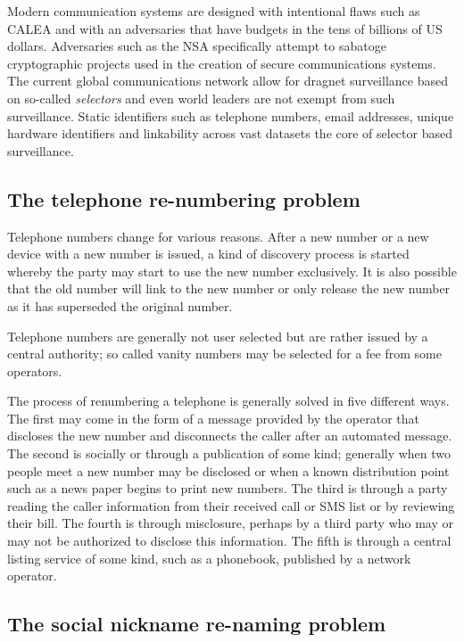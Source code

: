 \documentclass[letterpaper,twocolumn,10pt]{article}
\begin{document}
Modern communication systems are designed with intentional flaws such as
CALEA\cite{CALEA} and with an adversaries that have budgets in the tens of
billions of US dollars\cite{NSABUDGET}. Adversaries such as the NSA
specifically attempt to sabatoge cryptographic projects\cite{BULLRUN} used in
the creation of secure communications systems. The current global
communications network allow for dragnet surveillance based on so-called {\it
selectors} and even world leaders\cite{MERKELPHONE} are not exempt from such
surveillance. Static identifiers such as telephone numbers, email addresses,
unique hardware identifiers and linkability across vast datasets the core of
selector based surveillance.

\subsection{The telephone re-numbering problem}
\label{renumber:telephone}

Telephone numbers change for various reasons. After a new number or a new
device with a new number is issued, a kind of discovery process is started
whereby the party may start to use the new number exclusively. It is also
possible that the old number will link to the new number or only release the
new number as it has superseded the original number.

Telephone numbers are generally not user selected but are rather issued by a
central authority; so called vanity numbers may be selected for a fee from
some operators.

The process of renumbering a telephone is generally solved in five different
ways. The first may come in the form of a message provided by the operator
that discloses the new number and disconnects the caller after an automated
message. The second is socially or through a publication of some kind;
generally when two people meet a new number may be disclosed or when a known
distribution point such as a news paper begins to print new numbers. The third
is through a party reading the caller information from their received call or
SMS list or by reviewing their bill. The fourth is through
misclosure\cite{kellycaine}, perhaps by a third party who may or may not be
authorized to disclose this information. The fifth is through a central listing
service of some kind, such as a phonebook, published by a network operator.

\subsection{The social nickname re-naming problem}
\label{rename:social-nickname}
\end{document}
